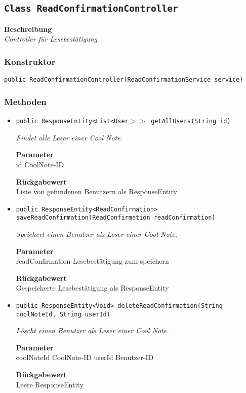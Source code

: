     \subsection{\texttt{Class ReadConfirmationController}}
    \textbf{Beschreibung} \\
    \textit{Controller für Lesebestätigung}
    \subsubsection*{Konstruktor}
    \texttt{public ReadConfirmationController(ReadConfirmationService service)}
    \subsubsection*{Methoden}
    \begin{itemize}
    	\item{\texttt{public ResponseEntity<List<User$>>$ getAllUsers(String id)}}
    	
    	\textit{Findet alle Leser einer Cool Note.}
    	
    	\textbf{Parameter} \\
    	id CoolNote-ID
    	
    	\textbf{Rückgabewert} \\
    	Liste von gefundenen Benutzern als ResponseEntity        \item{\texttt{public ResponseEntity<ReadConfirmation> saveReadConfirmation(ReadConfirmation readConfirmation)}}
    	
    	\textit{Speichert einen Benutzer als Leser einer Cool Note.}
    	
    	\textbf{Parameter} \\
    	readConfirmation Lesebestätigung zum speichern
    	
    	\textbf{Rückgabewert} \\
    	Gespeicherte Lesebestätigung als ResponseEntity        \item{\texttt{public ResponseEntity<Void> deleteReadConfirmation(String coolNoteId, String userId)}}
    	
    	\textit{Löscht einen Benutzer als Leser einer Cool Note.}
    	
    	\textbf{Parameter} \\
    	coolNoteId CoolNote-ID
    	userId Benutzer-ID
    	
    	\textbf{Rückgabewert} \\
    	Leere ResponseEntity
    \end{itemize}
